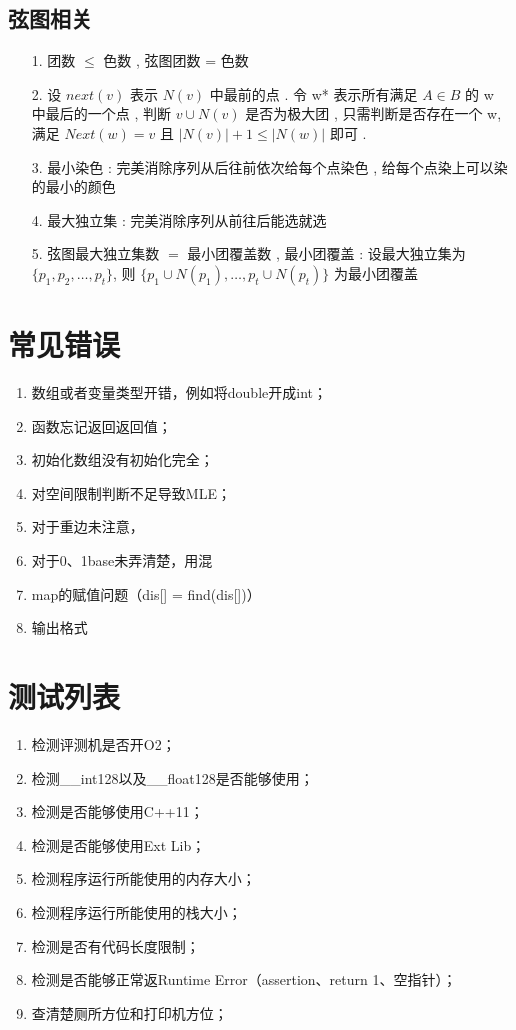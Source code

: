 \documentclass[a4paper]{ctexart}
\begin{document}
\subsection{弦图相关}
\begin{enumerate}
	\item[1.] 团数 $\leq$ 色数 , 弦图团数 = 色数
	\item[2.] 设 $next(v)$ 表示 $N(v)$ 中最前的点 .
	令 w* 表示所有满足 $A \in B$ 的 w 中最后的一个点 ,
	判断 $v \cup N(v)$ 是否为极大团 ,
	只需判断是否存在一个 w,
	满足 $Next(w)=v$ 且 $|N(v)| + 1 \leq |N(w)|$ 即可 .
	\item[3.] 最小染色 : 完美消除序列从后往前依次给每个点染色 ,
	给每个点染上可以染的最小的颜色
	\item[4.] 最大独立集 : 完美消除序列从前往后能选就选
	\item[5.] 弦图最大独立集数 $=$ 最小团覆盖数 ,
	最小团覆盖 :
	设最大独立集为 $\{p_1,p_2, \dots ,p_t\}$,
	则 $\{p_1\cup N(p_1), \dots , p_t \cup N(p_t)\}$
	为最小团覆盖
\end{enumerate}


\section{常见错误}

\begin{spacing}{0.6}
	\begin{enumerate}
		\item 数组或者变量类型开错，例如将double开成int；
		\item 函数忘记返回返回值；
		\item 初始化数组没有初始化完全；
		\item 对空间限制判断不足导致MLE；
		\item 对于重边未注意，
		\item 对于0、1base未弄清楚，用混
		\item map的赋值问题（dis[] = find(dis[])）
		\item 输出格式
	\end{enumerate}
\end{spacing}

\section{测试列表}
\begin{spacing}{0.6}
	\begin{enumerate}
		\item 检测评测机是否开O2；
		\item 检测\_\_int128以及\_\_float128是否能够使用；
		\item 检测是否能够使用C++11；
		\item 检测是否能够使用Ext Lib；
		\item 检测程序运行所能使用的内存大小；
		\item 检测程序运行所能使用的栈大小；
		\item 检测是否有代码长度限制；
		\item 检测是否能够正常返Runtime Error（assertion、return 1、空指针）；
		\item 查清楚厕所方位和打印机方位；
	\end{enumerate}
\end{spacing}
\end{document}
